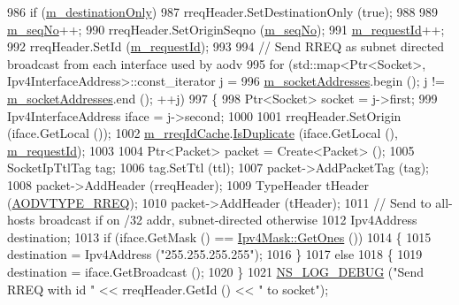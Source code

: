 \begin{DoxyCode}
986   \textcolor{keywordflow}{if} (\hyperlink{classns3_1_1aodv_1_1RoutingProtocol_aad49f5618b2843a1ae43a9c50aabc54f}{m\_destinationOnly})
987     rreqHeader.SetDestinationOnly (\textcolor{keyword}{true});
988 
989   \hyperlink{classns3_1_1aodv_1_1RoutingProtocol_abf5ef6b30d0ccf20b9b5ecf7918f67b2}{m\_seqNo}++;
990   rreqHeader.SetOriginSeqno (\hyperlink{classns3_1_1aodv_1_1RoutingProtocol_abf5ef6b30d0ccf20b9b5ecf7918f67b2}{m\_seqNo});
991   \hyperlink{classns3_1_1aodv_1_1RoutingProtocol_a0075a9d7db2eeb40aaa9066c0a073942}{m\_requestId}++;
992   rreqHeader.SetId (\hyperlink{classns3_1_1aodv_1_1RoutingProtocol_a0075a9d7db2eeb40aaa9066c0a073942}{m\_requestId});
993 
994   \textcolor{comment}{// Send RREQ as subnet directed broadcast from each interface used by aodv}
995   \textcolor{keywordflow}{for} (std::map<Ptr<Socket>, Ipv4InterfaceAddress>::const\_iterator j =
996          \hyperlink{classns3_1_1aodv_1_1RoutingProtocol_aa3263563cbbd735faafbf17fd4e28a10}{m\_socketAddresses}.begin (); j != \hyperlink{classns3_1_1aodv_1_1RoutingProtocol_aa3263563cbbd735faafbf17fd4e28a10}{m\_socketAddresses}.end (); ++j)
997     \{
998       Ptr<Socket> socket = j->first;
999       Ipv4InterfaceAddress iface = j->second;
1000 
1001       rreqHeader.SetOrigin (iface.GetLocal ());
1002       \hyperlink{classns3_1_1aodv_1_1RoutingProtocol_a96743ff957b0a878c23e55a84e209d5d}{m\_rreqIdCache}.\hyperlink{classns3_1_1aodv_1_1IdCache_a6f32458e4f47ab3d977d8c81742b172c}{IsDuplicate} (iface.GetLocal (), 
      \hyperlink{classns3_1_1aodv_1_1RoutingProtocol_a0075a9d7db2eeb40aaa9066c0a073942}{m\_requestId});
1003 
1004       Ptr<Packet> packet = Create<Packet> ();
1005       SocketIpTtlTag tag;
1006       tag.SetTtl (ttl);
1007       packet->AddPacketTag (tag);
1008       packet->AddHeader (rreqHeader);
1009       TypeHeader tHeader (\hyperlink{namespacens3_1_1aodv_a8cf417608302ba0ed75225c976944d44ad5f62dc18635d788b1a5b0dd834d46f0}{AODVTYPE\_RREQ});
1010       packet->AddHeader (tHeader);
1011       \textcolor{comment}{// Send to all-hosts broadcast if on /32 addr, subnet-directed otherwise}
1012       Ipv4Address destination;
1013       \textcolor{keywordflow}{if} (iface.GetMask () == \hyperlink{classns3_1_1Ipv4Mask_af712cbdf28c039025d4aa45fa7e243dd}{Ipv4Mask::GetOnes} ())
1014         \{
1015           destination = Ipv4Address (\textcolor{stringliteral}{"255.255.255.255"});
1016         \}
1017       \textcolor{keywordflow}{else}
1018         \{ 
1019           destination = iface.GetBroadcast ();
1020         \}
1021       \hyperlink{group__logging_ga413f1886406d49f59a6a0a89b77b4d0a}{NS\_LOG\_DEBUG} (\textcolor{stringliteral}{"Send RREQ with id "} << rreqHeader.GetId () << \textcolor{stringliteral}{" to socket"});

\end{DoxyCode}
